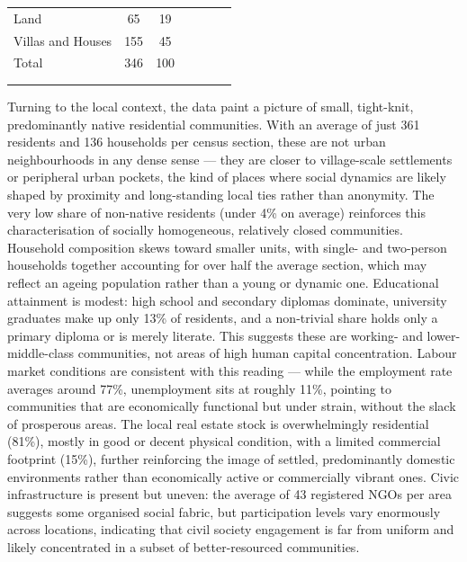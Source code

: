 \documentclass[12pt]{article}
\theoremstyle{plain}
\theoremstyle{plain}
\theoremstyle{plain}
\theoremstyle{definition}
\theoremstyle{plain}
\theoremstyle{definition}
\theoremstyle{plain}
\theoremstyle{remark}
\theoremstyle{definition}
\theoremstyle{definition}
\theoremstyle{plain}
\begin{document}
\begin{table}[H]
{\begin{tabular}{p{14.89em}llllll}
    \multicolumn{1}{l}{Land} & \multicolumn{1}{c}{65} & \multicolumn{1}{c}{19} &       &       &       &  \\
    \multicolumn{1}{l}{Villas and Houses} & \multicolumn{1}{c}{155} & \multicolumn{1}{c}{45} &       &       &       &  \\
    \multicolumn{1}{l}{Total} & \multicolumn{1}{c}{346} & \multicolumn{1}{c}{100} &       &       &       &  \\
    \multicolumn{1}{c}{} &       &       &       &       &       &  \\
    \midrule
    \multicolumn{7}{p{36.44em}}{} \\
    \end{tabular}%
       }
    \end{table}

Turning to the local context, the data paint a picture of small, tight-knit, predominantly native residential communities. With an average of just 361 residents and 136 households per census section, these are not urban neighbourhoods in any dense sense — they are closer to village-scale settlements or peripheral urban pockets, the kind of places where social dynamics are likely shaped by proximity and long-standing local ties rather than anonymity. The very low share of non-native residents (under 4\% on average) reinforces this characterisation of socially homogeneous, relatively closed communities. Household composition skews toward smaller units, with single- and two-person households together accounting for over half the average section, which may reflect an ageing population rather than a young or dynamic one. Educational attainment is modest: high school and secondary diplomas dominate, university graduates make up only 13\% of residents, and a non-trivial share holds only a primary diploma or is merely literate. This suggests these are working- and lower-middle-class communities, not areas of high human capital concentration. Labour market conditions are consistent with this reading — while the employment rate averages around 77\%, unemployment sits at roughly 11\%, pointing to communities that are economically functional but under strain, without the slack of prosperous areas. The local real estate stock is overwhelmingly residential (81\%), mostly in good or decent physical condition, with a limited commercial footprint (15\%), further reinforcing the image of settled, predominantly domestic environments rather than economically active or commercially vibrant ones. Civic infrastructure is present but uneven: the average of 43 registered NGOs per area suggests some organised social fabric, but participation levels vary enormously across locations, indicating that civil society engagement is far from uniform and likely concentrated in a subset of better-resourced communities.
\end{document}
